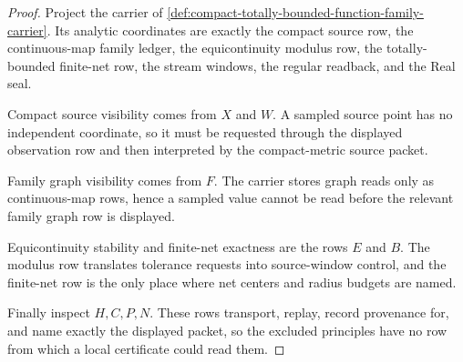 \begin{proof}
Project the carrier of \autoref{def:compact-totally-bounded-function-family-carrier}. Its analytic coordinates are exactly the compact source row, the continuous-map family ledger, the equicontinuity modulus row, the totally-bounded finite-net row, the stream windows, the regular readback, and the Real seal.

Compact source visibility comes from $X$ and $W$. A sampled source point has no independent coordinate, so it must be requested through the displayed observation row and then interpreted by the compact-metric source packet.

Family graph visibility comes from $F$. The carrier stores graph reads only as continuous-map rows, hence a sampled value cannot be read before the relevant family graph row is displayed.

Equicontinuity stability and finite-net exactness are the rows $E$ and $B$. The modulus row translates tolerance requests into source-window control, and the finite-net row is the only place where net centers and radius budgets are named.

Finally inspect $H,C,P,N$. These rows transport, replay, record provenance for, and name exactly the displayed packet, so the excluded principles have no row from which a local certificate could read them.
\end{proof}

